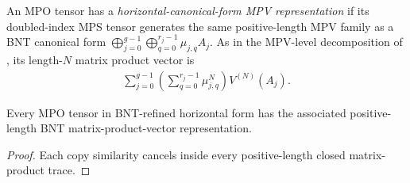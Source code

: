 \begin{definition}
    \label{def:horizontal_cf_mpv_representation}
    \leanok
    An MPO tensor has a \emph{horizontal-canonical-form MPV representation} if
    its doubled-index MPS tensor generates the same positive-length MPV family as a
    BNT canonical form
    $\bigoplus_{j=0}^{g-1}\bigoplus_{q=0}^{r_j-1}\mu_{j,q}A_j$.
    As in the MPV-level decomposition of
    \cite[Section~2.3, lines~298--301]{Cirac2016MPDO_arXiv}, its length-$N$
    matrix product vector is
    \begin{align}
        \sum_{j=0}^{g-1}
        \left(\sum_{q=0}^{r_j-1}\mu_{j,q}^{N}\right)V^{(N)}(A_j).
        \label{eq:mpdo_horizontal_mpv}
    \end{align}
\end{definition}

\begin{lemma}
    \label{thm:horizontal_cf_gives_mpv_representation}
    \leanok
    Every MPO tensor in BNT-refined horizontal form has the
    associated positive-length BNT matrix-product-vector representation.
\end{lemma}

\begin{proof}
    \leanok
    Each copy similarity cancels inside every positive-length closed
    matrix-product trace.
\end{proof}

